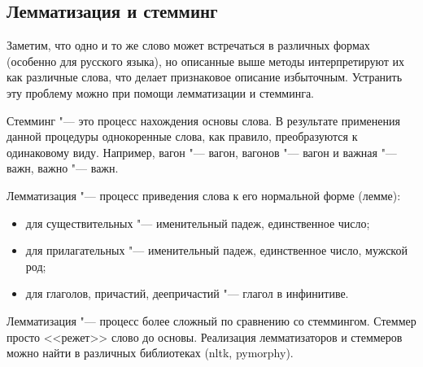 \documentclass[12pt,fleqn]{article}
\begin{document}
\subsection{Лемматизация и стемминг}

Заметим, что одно и то же слово может встречаться в различных формах (особенно для русского языка), но описанные выше методы интерпретируют их как различные слова, что делает признаковое описание избыточным. Устранить эту проблему можно при помощи лемматизации и стемминга.

Стемминг "--- это процесс нахождения основы слова. В результате применения данной процедуры однокоренные слова, как правило, преобразуются к одинаковому виду. Например, вагон "--- вагон, вагонов "--- вагон и важная "--- важн, важно "--- важн.

Лемматизация "--- процесс приведения слова к его нормальной форме (лемме):
\begin{itemize}
\item для существительных "--- именительный падеж, единственное число;
\item для прилагательных "--- именительный падеж, единственное число, мужской род;
\item для глаголов, причастий, деепричастий "--- глагол в инфинитиве.
\end{itemize}

Лемматизация "--- процесс более сложный по сравнению со стеммингом. Стеммер просто <<режет>> слово до основы. Реализация лемматизаторов и стеммеров можно найти в различных библиотеках (nltk, pymorphy).
\end{document}
